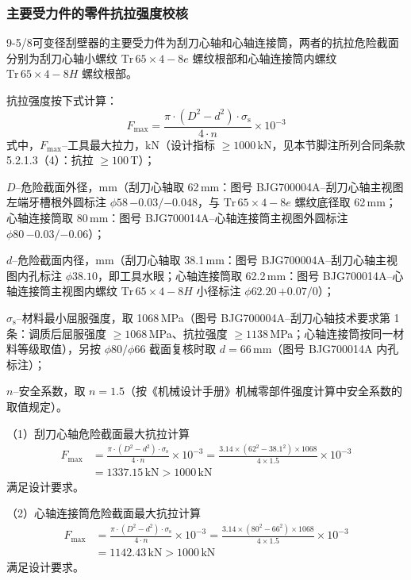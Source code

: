 \subsubsection{主要受力件的零件抗拉强度校核}

9-5/8\inch 可变径刮壁器的主要受力件为刮刀心轴和心轴连接筒，两者的抗拉危险截面分别为刮刀心轴小螺纹 $\mathrm{Tr}\,65 \times 4-8e$ 螺纹根部和心轴连接筒内螺纹 $\mathrm{Tr}\,65 \times 4-8H$ 螺纹根部。

抗拉强度按下式计算：
\begin{equation}
    F_{\max} = \frac{\pi \cdot (D^2 - d^2) \cdot \sigma_{\mathrm{s}}}{4 \cdot n} \times 10^{-3}
\end{equation}
式中，$F_{\max}$--工具最大拉力，kN（设计指标 $\ge 1000$\,kN，见本节脚注所列合同条款 5.2.1.3（4）：抗拉 $\ge 100$\,T）；

$D$--危险截面外径，mm（刮刀心轴取 62\,mm：图号 BJG700004A--刮刀心轴主视图左端牙槽根外圆标注 $\phi 58\,{-0.03}/{-0.048}$，与 $\mathrm{Tr}\,65\times4-8e$ 螺纹底径取 62\,mm；心轴连接筒取 80\,mm：图号 BJG700014A--心轴连接筒主视图外圆标注 $\phi 80\,{-0.03}/{-0.06}$）；

$d$--危险截面内径，mm（刮刀心轴取 38.1\,mm：图号 BJG700004A--刮刀心轴主视图内孔标注 $\phi 38.10$，即工具水眼；心轴连接筒取 62.2\,mm：图号 BJG700014A--心轴连接筒主视图内螺纹 $\mathrm{Tr}\,65\times4-8H$ 小径标注 $\phi 62.20\,{+0.07}/0$）；

$\sigma_{\mathrm{s}}$--材料最小屈服强度，取 1068\,MPa（图号 BJG700004A--刮刀心轴技术要求第 1 条：调质后屈服强度 $\ge 1068$\,MPa、抗拉强度 $\ge 1138$\,MPa；心轴连接筒按同一材料等级取值），另按 $\phi 80/\phi 66$ 截面复核时取 $d = 66\,\text{mm}$（图号 BJG700014A 内孔标注）；

$n$--安全系数，取 $n = 1.5$（按《机械设计手册》机械零部件强度计算中安全系数的取值规定\cite{ref26}）。

（1）刮刀心轴危险截面最大抗拉计算
\begin{equation}
    \begin{aligned}
    F_{\max} &= \frac{\pi \cdot (D^2 - d^2) \cdot \sigma_{\mathrm{s}}}{4 \cdot n} \times 10^{-3}
             = \frac{3.14 \times (62^2 - 38.1^2) \times 1068}{4 \times 1.5} \times 10^{-3} \\
             &= 1337.15\,\mathrm{kN} > 1000\,\mathrm{kN}
    \end{aligned}
\end{equation}
满足设计要求。

（2）心轴连接筒危险截面最大抗拉计算
\begin{equation}
    \begin{aligned}
    F_{\max} &= \frac{\pi \cdot (D^2 - d^2) \cdot \sigma_{\mathrm{s}}}{4 \cdot n} \times 10^{-3}
             = \frac{3.14 \times (80^2 - 66^2) \times 1068}{4 \times 1.5} \times 10^{-3} \\
             &= 1142.43\,\mathrm{kN} > 1000\,\mathrm{kN}
    \end{aligned}
\end{equation}
满足设计要求。

